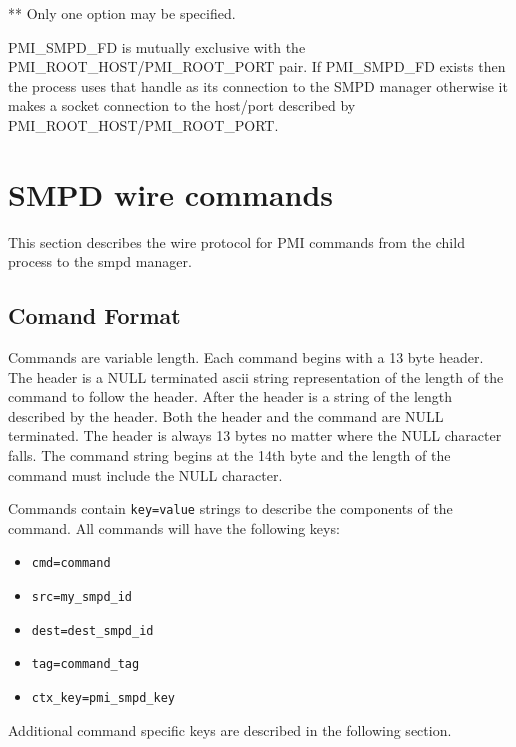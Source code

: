 \documentclass[dvipdfm,11pt]{article}
\begin{document}
** Only one option may be specified.

PMI\_SMPD\_FD is mutually exclusive with the 
PMI\_ROOT\_HOST/PMI\_ROOT\_PORT pair.  If PMI\_SMPD\_FD exists then 
the process uses that handle as its connection to the SMPD manager 
otherwise it makes a socket connection to the
host/port described by PMI\_ROOT\_HOST/PMI\_ROOT\_PORT.

\section{SMPD wire commands}
This section describes the wire protocol for PMI commands from the child
process to the smpd manager.

\subsection{Comand Format}
Commands are variable length.
Each command begins with a 13 byte header.  The header 
is a NULL terminated ascii string representation of the length of the 
command to follow the header.  After the header is a string of the length 
described by the header.  Both the header and the command are NULL terminated.
The header is always 13 bytes no matter where the NULL character falls.  The
command string begins at the 14th byte and the length of the command must 
include the NULL character.

Commands contain \texttt{key=value} strings to describe the components of 
the command.  All commands will have the following keys:

\begin{itemize}
\item \texttt{cmd=command}
\item \texttt{src=my\_smpd\_id}
\item \texttt{dest=dest\_smpd\_id}
\item \texttt{tag=command\_tag}
\item \texttt{ctx\_key=pmi\_smpd\_key}
\end{itemize}

Additional command specific keys are described in the following section.
\end{document}

